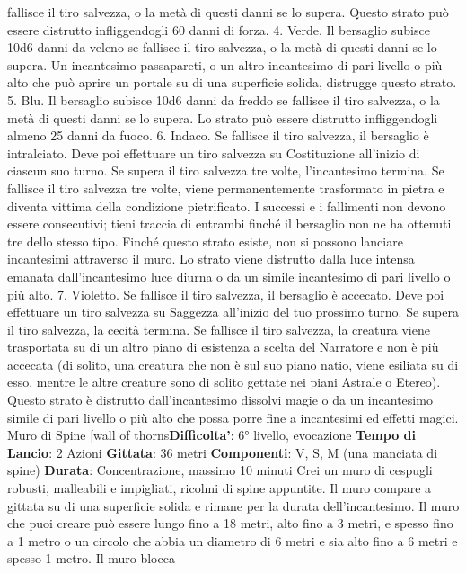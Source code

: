 \begin{multicols}{2}
fallisce il tiro salvezza, o la metà di questi danni se lo
supera. Questo strato può essere distrutto infliggendogli
60 danni di forza.
4. Verde. Il bersaglio subisce 10d6 danni da veleno se
fallisce il tiro salvezza, o la metà di questi danni se lo
supera. Un incantesimo passapareti, o un altro
incantesimo di pari livello o più alto che può aprire un
portale su di una superficie solida, distrugge questo
strato.
5. Blu. Il bersaglio subisce 10d6 danni da freddo se
fallisce il tiro salvezza, o la metà di questi danni se lo
supera. Lo strato può essere distrutto infliggendogli
almeno 25 danni da fuoco.
6. Indaco. Se fallisce il tiro salvezza, il bersaglio è
intralciato. Deve poi effettuare un tiro salvezza su
Costituzione all’inizio di ciascun suo turno. Se supera il
tiro salvezza tre volte, l’incantesimo termina. Se fallisce
il tiro salvezza tre volte, viene permanentemente
trasformato in pietra e diventa vittima della condizione
pietrificato. I successi e i fallimenti non devono essere
consecutivi; tieni traccia di entrambi finché il bersaglio
non ne ha ottenuti tre dello stesso tipo.
Finché questo strato esiste, non si possono lanciare
incantesimi attraverso il muro. Lo strato viene distrutto
dalla luce intensa emanata dall’incantesimo luce diurna
o da un simile incantesimo di pari livello o più alto.
7. Violetto. Se fallisce il tiro salvezza, il bersaglio è
accecato. Deve poi effettuare un tiro salvezza su
Saggezza all’inizio del tuo prossimo turno. Se supera il
tiro salvezza, la cecità termina. Se fallisce il tiro
salvezza, la creatura viene trasportata su di un altro
piano di esistenza a scelta del Narratore e non è più accecata
(di solito, una creatura che non è sul suo piano natio,
viene esiliata su di esso, mentre le altre creature sono
di solito gettate nei piani Astrale o Etereo). Questo
strato è distrutto dall’incantesimo dissolvi magie o da un
incantesimo simile di pari livello o più alto che possa
porre fine a incantesimi ed effetti magici.
Muro di Spine
[wall of thorns\textbf{Difficolta'}:
6° livello, evocazione
\textbf{Tempo di Lancio}: 2 Azioni
\textbf{Gittata}: 36 metri
\textbf{Componenti}: V, S, M (una manciata di spine)
\textbf{Durata}: Concentrazione, massimo 10 minuti
Crei un muro di cespugli robusti, malleabili e impigliati,
ricolmi di spine appuntite. Il muro compare a gittata su
di una superficie solida e rimane per la durata
dell’incantesimo. Il muro che puoi creare può essere
lungo fino a 18 metri, alto fino a 3 metri, e spesso fino a
1 metro o un circolo che abbia un diametro di 6 metri e
sia alto fino a 6 metri e spesso 1 metro. Il muro blocca

\end{multicols}
